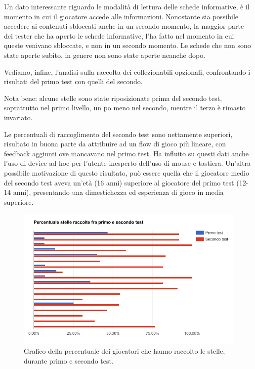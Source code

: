 Un dato interessante riguardo le modalità di lettura delle schede informative, è il momento in cui il giocatore accede alle informazioni. Nonostante sia possibile accedere ai contenuti sbloccati anche in un secondo momento, la maggior parte dei tester che ha aperto le schede informative, l'ha fatto nel momento in cui queste venivano sbloccate, e non in un secondo momento. Le schede che non sono state aperte subito, in genere non sono state aperte neanche dopo.

Vediamo, infine, l'analisi sulla raccolta dei collezionabili opzionali, confrontando i risultati del primo test con quelli del secondo.

Nota bene: alcune stelle sono state riposizionate prima del secondo test, soprattutto nel primo livello, un po meno nel secondo, mentre il terzo è rimasto invariato.

Le percentuali di raccoglimento del secondo test sono nettamente superiori, risultato in buona parte da attribuire ad un flow di gioco più lineare, con feedback aggiunti ove mancavano nel primo test. Ha influito su questi dati anche l'uso di device ad hoc per l'utente inesperto dell'uso di mouse e tastiera. Un'altra possibile motivazione di questo risultato, può essere quella che il giocatore medio del secondo test aveva un'età (16 anni) superiore al giocatore del primo test (12-14 anni), presentando una dimestichezza ed esperienza di gioco in media superiore.

\begin{figure}[h]
\centerline{\includegraphics[scale=0.65]{images/risultati/test-stelle.png}}
\caption{Grafico della percentuale dei giocatori che hanno raccolto le stelle, durante primo e secondo test.}
\label{fig:test-stelle}
\end{figure}

\newpage